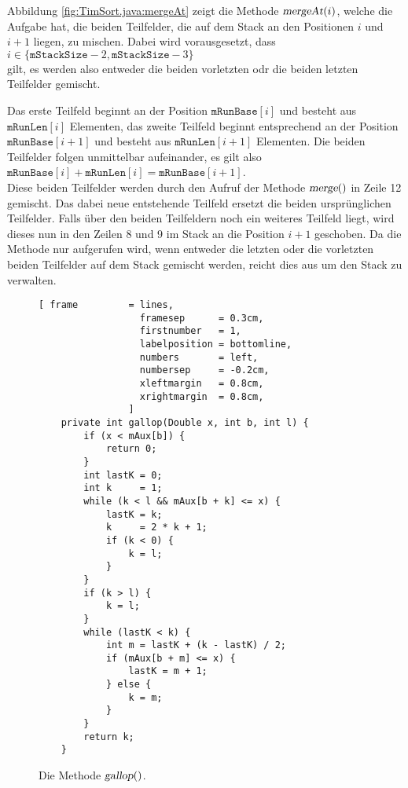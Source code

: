 Abbildung \ref{fig:TimSort.java:mergeAt} zeigt die Methode $\textsl{mergeAt}(i)$, welche die Aufgabe
hat, die beiden Teilfelder, die auf dem Stack an den Positionen $i$ und $i+1$ liegen, zu mischen.
Dabei wird vorausgesetzt, dass 
\\[0.2cm]
\hspace*{1.3cm}
$ i \in \{  \mathtt{mStackSize} - 2, \mathtt{mStackSize} - 3 \}$
\\[0.2cm] 
gilt, es werden also entweder die beiden vorletzten odr die beiden letzten Teilfelder gemischt.

Das erste Teilfeld beginnt an der Position $\mathtt{mRunBase}[i]$ und besteht aus
$\mathtt{mRunLen}[i]$ Elementen,
das zweite Teilfeld beginnt entsprechend an der Position $\mathtt{mRunBase}[i+1]$ und besteht aus
$\mathtt{mRunLen}[i+1]$ Elementen.  Die beiden Teilfelder folgen unmittelbar aufeinander, es gilt also
\\[0.2cm]
\hspace*{1.3cm}
$\mathtt{mRunBase}[i] + \mathtt{mRunLen}[i] = \mathtt{mRunBase}[i+1]$.
\\[0.2cm]
Diese beiden Teilfelder werden durch den Aufruf der Methode $\textsl{merge}()$ in Zeile 12 gemischt.
Das dabei neue entstehende Teilfeld ersetzt die beiden urspr\"unglichen Teilfelder.  Falls \"uber den
beiden Teilfeldern noch ein weiteres Teilfeld liegt, wird dieses nun in den Zeilen 8 und 9 im Stack
an die Position $i+1$ geschoben.  Da die Methode nur aufgerufen wird, wenn entweder die letzten oder
die vorletzten beiden Teilfelder auf dem Stack gemischt werden, reicht dies aus um den Stack zu verwalten.

\begin{figure}[!ht]
\centering
\begin{Verbatim}[ frame         = lines, 
                  framesep      = 0.3cm, 
                  firstnumber   = 1,
                  labelposition = bottomline,
                  numbers       = left,
                  numbersep     = -0.2cm,
                  xleftmargin   = 0.8cm,
                  xrightmargin  = 0.8cm,
                ]
    private int gallop(Double x, int b, int l) {
        if (x < mAux[b]) {
            return 0;
        } 
        int lastK = 0;
        int k     = 1;
        while (k < l && mAux[b + k] <= x) {
            lastK = k;
            k     = 2 * k + 1;
            if (k < 0) {
                k = l;
            }
        }
        if (k > l) {
            k = l;
        }
        while (lastK < k) {
            int m = lastK + (k - lastK) / 2;
            if (mAux[b + m] <= x) {
                lastK = m + 1;  
            } else {
                k = m;          
            }
        }
        return k;             
    }
\end{Verbatim}
\vspace*{-0.3cm}
\caption{Die Methode $\textsl{gallop}()$.}
\label{fig:TimSort.java:gallop}
\end{figure}


